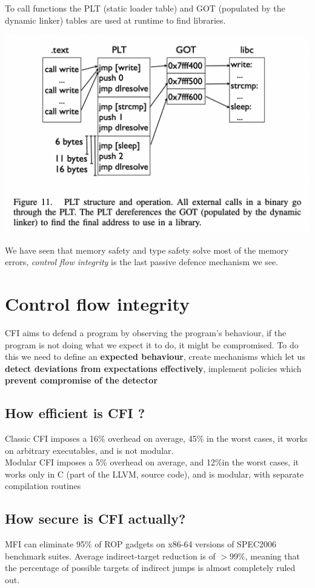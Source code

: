 \documentclass[11pt, oneside]{article}   	%
\begin{document}
To call functions the PLT (static loader table) and GOT (populated by the dynamic linker) tables are used at runtime to find libraries.
\begin{center}
\includegraphics[scale = 0.4]{plt}
\end{center}
We have seen that memory safety and type safety solve most of the memory errors, \emph{control flow integrity} is the last passive defence mechanism we see.



\section*{Control flow integrity}
CFI aims to defend a program by observing the program's behaviour, if the program is not doing what we expect it to do, it might be compromised. To do this we need to define an \textbf{expected behaviour}, create mechanisms which let us \textbf{detect deviations from expectations effectively}, implement policies which \textbf{prevent compromise of the detector}
\subsection*{How efficient is CFI ?}
Classic CFI imposes a 16\% overhead on average, 45\% in the worst cases, it works on arbitrary executables, and is not modular.\\
Modular CFI imposes a 5\% overhead on average, and 12\%in the worst cases, it works only in C (part of the LLVM, source code), and is modular, with separate compilation routines
\subsection*{How secure is CFI actually?}
MFI can eliminate 95\% of ROP gadgets on x86-64 versions of SPEC2006 benchmark suites. Average indirect-target reduction is of $>99\%$, meaning that the percentage of possible targets of indirect jumps is almost completely ruled out.
\end{document}
